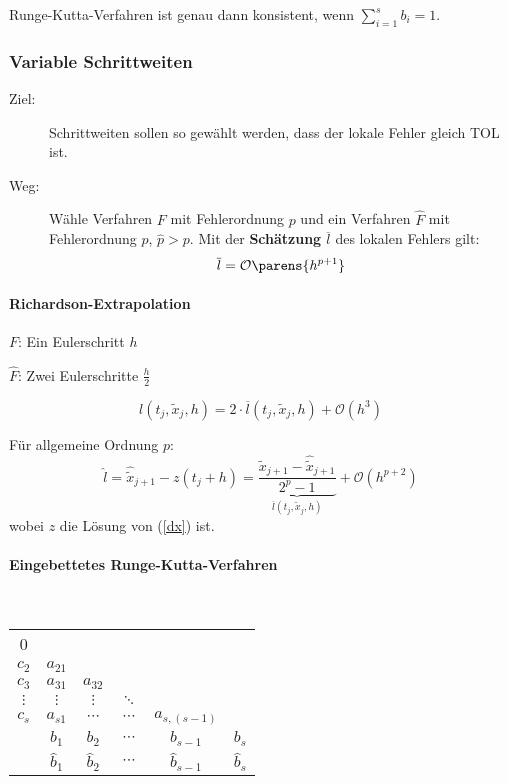 				Runge-Kutta-Verfahren ist genau dann konsistent, wenn $\sum_{i=1}^{s} b_i = 1$.

		\subsubsection{Variable Schrittweiten}
			\begin{description}
				\item[Ziel:] Schrittweiten sollen so gewählt werden, dass der lokale Fehler gleich TOL ist.\\
				\item[Weg:] Wähle Verfahren $F$ mit Fehlerordnung $p$ und ein Verfahren $\hat F$ mit Fehlerordnung $\hat p$, $\hat p > p$. Mit der \textbf{Schätzung} $\overline{l}$ des lokalen Fehlers gilt:
					\[
						\overline{l}=\mathcal{O}\parens{ h^{p+1} }
					\]
			\end{description}

			\paragraph{Richardson-Extrapolation}
				\begin{tightitemize}
					\item[$F$:] Ein Eulerschritt $h$
					\item[$\hat F$:] Zwei Eulerschritte $\frac{h}{2}$
				\end{tightitemize}

				\[
					l(t_j,\tilde x_j, h) = 2\cdot \overline{l}(t_j,\tilde x_j, h) + \mathcal{O}\left( h^3\right)
				\]

				Für allgemeine Ordnung $p$:
				\[
					\hat l = \hat{\tilde{x}}_{j+1} - z(t_j + h) = \underbrace{\frac{\tilde x_{j+1} - \hat{\tilde{x}}_{j+1}}{2^p - 1}}_{\overline{l}(t_j, \tilde x_j, h)} + \mathcal{O}\left( h^{p+2}\right)
				\]
				wobei $z$ die Lösung von (\ref{dx}) ist.

			\paragraph{Eingebettetes Runge-Kutta-Verfahren} ~

				\hspace{5ex}
				\begin{tabular}
					{c|ccccc} 0 & & & & & \\
					$c_2$ & $a_{21}$ & & & & \\
					$c_3$ & $a_{31}$ & $a_{32}$ & & & \\
					$\vdots$ & $\vdots$ & $\vdots$ & $\ddots$ & & \\
					$c_s$ & $a_{s1}$ & $\cdots$ & $\cdots$ & $a_{s,(s-1)}$ & \\
					\hline & $b_1$ & $b_2$ & $\cdots$ & $b_{s-1}$ & $b_s$\\
					\hline & $\hat b_1$ & $\hat b_2$ & $\cdots$ & $\hat b_{s-1}$ & $\hat b_s$\\
				\end{tabular}

